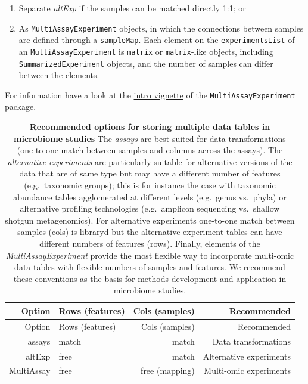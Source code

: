 \documentclass[
]{book}
\providecommand{\tightlist}{%
  \setlength{\itemsep}{0pt}\setlength{\parskip}{0pt}}
\begin{document}
\begin{enumerate}
\def\labelenumi{\arabic{enumi}.}
\tightlist
\item
  Separate \emph{altExp} if the samples can be matched directly 1:1; or
\item
  As \texttt{MultiAssayExperiment} objects, in which the connections between
  samples are defined through a \texttt{sampleMap}. Each element on the
  \texttt{experimentsList} of an \texttt{MultiAssayExperiment} is \texttt{matrix} or
  \texttt{matrix}-like objects, including \texttt{SummarizedExperiment} objects, and
  the number of samples can differ between the elements.
\end{enumerate}

For information have a look at the \href{https://bioconductor.org/packages/release/bioc/vignettes/MultiAssayExperiment/inst/doc/MultiAssayExperiment.html}{intro vignette} of the \texttt{MultiAssayExperiment} package.

\begin{longtable}[]{@{}rlrr@{}}
\caption{\label{tab:options} \textbf{Recommended options for storing multiple data tables in microbiome studies} The \emph{assays} are best suited for data transformations (one-to-one match between samples and columns across the assays). The \emph{alternative experiments} are particularly suitable for alternative versions of the data that are of same type but may have a different number of features (e.g.~taxonomic groups); this is for instance the case with taxonomic abundance tables agglomerated at different levels (e.g.~genus vs.~phyla) or alternative profiling technologies (e.g.~amplicon sequencing vs.~shallow shotgun metagenomics). For alternative experiments one-to-one match between samples (cols) is libraryd but the alternative experiment tables can have different numbers of features (rows). Finally, elements of the \emph{MultiAssayExperiment} provide the most flexible way to incorporate multi-omic data tables with flexible numbers of samples and features. We recommend these conventions as the basis for methods development and application in microbiome studies.}\tabularnewline
\toprule()
Option & Rows (features) & Cols (samples) & Recommended \\
\midrule()
\endfirsthead
\toprule()
Option & Rows (features) & Cols (samples) & Recommended \\
\midrule()
\endhead
assays & match & match & Data transformations \\
altExp & free & match & Alternative experiments \\
MultiAssay & free & free (mapping) & Multi-omic experiments \\
\bottomrule()
\end{longtable}
\end{document}
